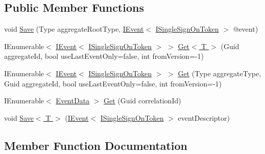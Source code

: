\subsection*{Public Member Functions}
\begin{DoxyCompactItemize}
\item 
void \hyperlink{classCqrs_1_1Tests_1_1Substitutes_1_1TestEventStoreWithBugs_ae2208808270f6f4b20856f04b5693f2c_ae2208808270f6f4b20856f04b5693f2c}{Save} (Type aggregate\+Root\+Type, \hyperlink{interfaceCqrs_1_1Events_1_1IEvent}{I\+Event}$<$ \hyperlink{interfaceCqrs_1_1Authentication_1_1ISingleSignOnToken}{I\+Single\+Sign\+On\+Token} $>$ @event)
\item 
I\+Enumerable$<$ \hyperlink{interfaceCqrs_1_1Events_1_1IEvent}{I\+Event}$<$ \hyperlink{interfaceCqrs_1_1Authentication_1_1ISingleSignOnToken}{I\+Single\+Sign\+On\+Token} $>$ $>$ \hyperlink{classCqrs_1_1Tests_1_1Substitutes_1_1TestEventStoreWithBugs_a7b9ba57d07fa9ffc6d404d006e25c2b5_a7b9ba57d07fa9ffc6d404d006e25c2b5}{Get$<$ T $>$} (Guid aggregate\+Id, bool use\+Last\+Event\+Only=false, int from\+Version=-\/1)
\item 
I\+Enumerable$<$ \hyperlink{interfaceCqrs_1_1Events_1_1IEvent}{I\+Event}$<$ \hyperlink{interfaceCqrs_1_1Authentication_1_1ISingleSignOnToken}{I\+Single\+Sign\+On\+Token} $>$ $>$ \hyperlink{classCqrs_1_1Tests_1_1Substitutes_1_1TestEventStoreWithBugs_af0ff73d3f8e8b28574ecef798d0be503_af0ff73d3f8e8b28574ecef798d0be503}{Get} (Type aggregate\+Type, Guid aggregate\+Id, bool use\+Last\+Event\+Only=false, int from\+Version=-\/1)
\item 
I\+Enumerable$<$ \hyperlink{classCqrs_1_1Events_1_1EventData}{Event\+Data} $>$ \hyperlink{classCqrs_1_1Tests_1_1Substitutes_1_1TestEventStoreWithBugs_a29c1feb49762bd4a85cf69daa4a0f881_a29c1feb49762bd4a85cf69daa4a0f881}{Get} (Guid correlation\+Id)
\item 
void \hyperlink{classCqrs_1_1Tests_1_1Substitutes_1_1TestEventStoreWithBugs_a22ce91768f915a6f01894137dd314c42_a22ce91768f915a6f01894137dd314c42}{Save$<$ T $>$} (\hyperlink{interfaceCqrs_1_1Events_1_1IEvent}{I\+Event}$<$ \hyperlink{interfaceCqrs_1_1Authentication_1_1ISingleSignOnToken}{I\+Single\+Sign\+On\+Token} $>$ event\+Descriptor)
\end{DoxyCompactItemize}


\subsection{Member Function Documentation}
\mbox{\label{classCqrs_1_1Tests_1_1Substitutes_1_1TestEventStoreWithBugs_af0ff73d3f8e8b28574ecef798d0be503_af0ff73d3f8e8b28574ecef798d0be503}} 
